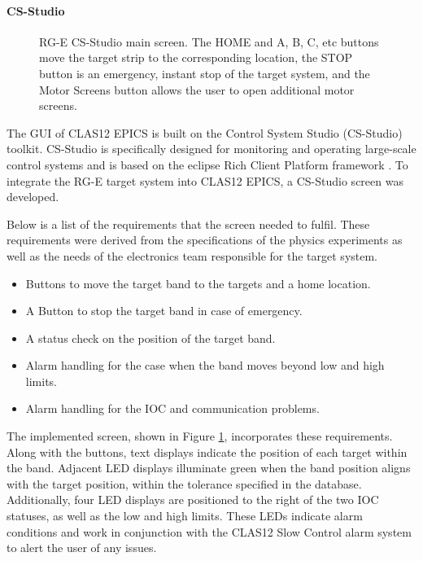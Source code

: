 \paragraph{CS-Studio}
    \begin{figure}[b!]
        \caption[Run Group E (RG-E) CS-Studio main screen]
        {RG-E CS-Studio main screen.
        The HOME and A, B, C, etc buttons move the target strip to the corresponding location, the STOP button is an emergency, instant stop of the target system, and the Motor Screens button allows the user to open additional motor screens.}
        \label{fig::11.312::rge_motorx}
    \end{figure}

    The GUI of CLAS12 EPICS is built on the Control System Studio (CS-Studio) toolkit.
    CS-Studio is specifically designed for monitoring and operating large-scale control systems and is based on the eclipse Rich Client Platform framework \cite{kasemir2007}.
    To integrate the RG-E target system into CLAS12 EPICS, a CS-Studio screen was developed.

    Below is a list of the requirements that the screen needed to fulfil.
    These requirements were derived from the specifications of the physics experiments as well as the needs of the electronics team responsible for the target system.

    \begin{itemize}
        \item
            Buttons to move the target band to the targets and a home location.
        \item
            A Button to stop the target band in case of emergency.
        \item
            A status check on the position of the target band.
        \item
            Alarm handling for the case when the band moves beyond low and high limits.
        \item
            Alarm handling for the IOC and communication problems.
    \end{itemize}

    The implemented screen, shown in Figure \ref{fig::11.312::rge_motorx}, incorporates these requirements.
    Along with the buttons, text displays indicate the position of each target within the band.
    Adjacent LED displays illuminate green when the band position aligns with the target position, within the tolerance specified in the database.
    Additionally, four LED displays are positioned to the right of the two IOC statuses, as well as the low and high limits.
    These LEDs indicate alarm conditions and work in conjunction with the CLAS12 Slow Control alarm system to alert the user of any issues.

